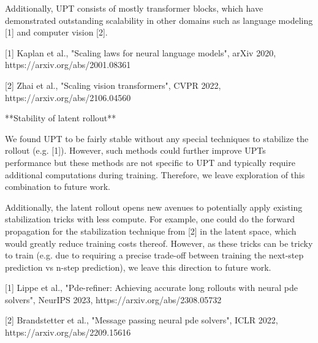 Additionally, UPT consists of mostly transformer blocks, which have demonstrated outstanding scalability in other domains such as language modeling [1] and computer vision [2].


[1] Kaplan et al., "Scaling laws for neural language models", arXiv 2020, https://arxiv.org/abs/2001.08361


[2] Zhai et al., "Scaling vision transformers", CVPR 2022, https://arxiv.org/abs/2106.04560


**Stability of latent rollout**


We found UPT to be fairly stable without any special techniques to stabilize the rollout (e.g. [1]). However, such methods could further improve UPTs performance but these methods are not specific to UPT and typically require additional computations during training. Therefore, we leave exploration of this combination to future work.

Additionally, the latent rollout opens new avenues to potentially apply existing stabilization tricks with less compute. For example, one could do the forward propagation for the stabilization technique from [2] in the latent space, which would greatly reduce training costs thereof. However, as these tricks can be tricky to train (e.g. due to requiring a precise trade-off between training the next-step prediction vs n-step prediction), we leave this direction to future work.



[1] Lippe et al., "Pde-refiner: Achieving accurate long rollouts with neural pde solvers", NeurIPS 2023, https://arxiv.org/abs/2308.05732

[2] Brandstetter et al., "Message passing neural pde solvers", ICLR 2022, https://arxiv.org/abs/2209.15616